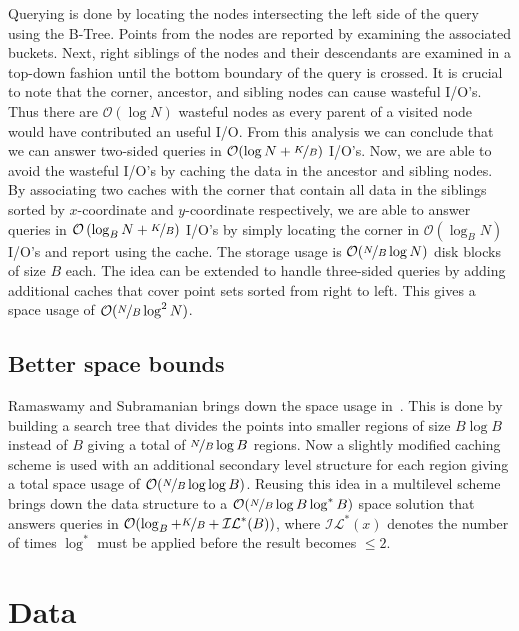 \documentclass[twoside,11pt,openright]{report}
\begin{document}
Querying is done by locating the nodes intersecting the left side of the query using the B-Tree. Points from the nodes are reported by examining the associated buckets. Next, right siblings of the nodes and their descendants are examined in a top-down fashion until the bottom boundary of the query is crossed. It is crucial to note that the corner, ancestor, and sibling nodes can cause wasteful I/O's. Thus there are $\mathcal{O}(\log N)$ wasteful nodes as every parent of a visited node would have contributed an useful I/O. From this analysis we can conclude that we can answer two-sided queries in $\mathcal{O}(\log N + \nicefrac{K}{B})$ I/O's. Now, we are able to avoid the wasteful I/O's by caching the data in the ancestor and sibling nodes. By associating two caches with the corner that contain all data in the siblings sorted by $x$-coordinate and $y$-coordinate respectively, we are able to answer queries in $\mathcal{O}\left(\log_B N + \nicefrac{K}{B}\right)$ I/O's by simply locating the corner in $\mathcal{O}(\log_B N)$ I/O's and report using the cache. The storage usage is $\mathcal{O}(\nicefrac{N}{B} \log N)$ disk blocks of size $B$ each. The idea can be extended to handle three-sided queries by adding additional caches that cover point sets sorted from right to left. This gives a space usage of $\mathcal{O}(\nicefrac{N}{B} \log^2 N)$. 

\section{Better space bounds}
\label{sec:ramaswamy_better_space}

Ramaswamy and Subramanian brings down the space usage in~\cite{Subramanian:1995:PTN:313651.313769}. This is done by building a search tree that divides the points into smaller regions of size $B \log B$ instead of $B$ giving a total of $\nicefrac{N}{B} \log B$ regions. Now a slightly modified caching scheme is used with an additional secondary level structure for each region giving a total space usage of $\mathcal{O}(\nicefrac{N}{B} \log \log B)$. Reusing this idea in a multilevel scheme brings down the data structure to a $\mathcal{O}(\nicefrac{N}{B} \log B \log^* B)$ space solution that answers queries in $\mathcal{O}(\log_B + \nicefrac{K}{B} + \mathcal{IL}^*(B))$, where $\mathcal{IL^*}(x)$ denotes the number of times $\log^*$ must be applied before the result becomes $\leq 2$.


\chapter{Data}
\label{app:data}
\end{document}
